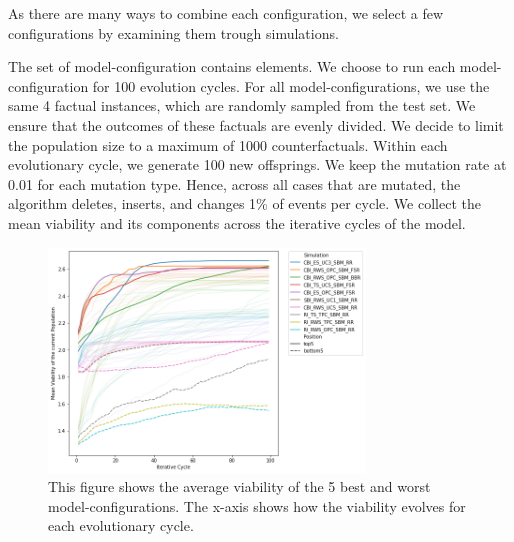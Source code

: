 \documentclass[./../../paper.tex]{subfiles}
\begin{document}
\label{sec:exp1}
As there are many ways to combine each configuration, we select a few configurations by examining them trough simulations.  



The set of model-configuration contains \NumEvoCombinations elements. 
We choose to run each model-configuration for 100 evolution cycles. 
For all model-configurations, we use the same 4 factual \glspl{instance}, which are randomly sampled from the test set. We ensure that the outcomes of these factuals are evenly divided. 
We decide to limit the population size to a maximum of 1000 counterfactuals. Within each evolutionary cycle, we generate 100 new offsprings. We keep the mutation rate at 0.01 for each mutation type. Hence, across all cases that are mutated, the algorithm deletes, inserts, and changes 1\% of events per cycle. We collect the mean viability and its components across the iterative cycles of the model.



\begin{figure}[htbp]
    \centering
    \includegraphics[width=0.75\textwidth]{figures/generated/exp1_effect_on_viability_top10_last10.png}
    \caption{This figure shows the average viability of the 5 best and worst model-configurations. The x-axis shows how the viability evolves for each evolutionary cycle.}
    \label{fig:average-viability}
\end{figure}
\end{document}
